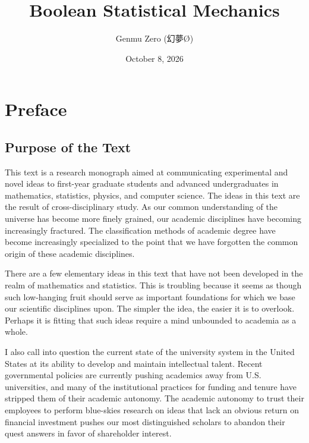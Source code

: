 \documentclass[10pt, a5paper, twoside, openright]{memoir}
\title{Boolean Statistical Mechanics}
\author{Genmu Zero (幻夢Ø)}
\date{October 8, 2026}
\begin{document}
%
%
    

\setlength{\parindent}{1.5em}


\clearpage\maketitle\thispagestyle{empty}


\frontmatter
\tableofcontents

\listoffigures


\chapter{Preface}

\section{Purpose of the Text}

This text is a research monograph aimed at communicating experimental and novel ideas to first-year graduate students and advanced undergraduates in mathematics, statistics, physics, and computer science. The ideas in this text are the result of cross-disciplinary study. As our common understanding of the universe has become more finely grained, our academic disciplines have becoming increasingly fractured. The classification methods of academic degree have become increasingly specialized to the point that we have forgotten the common origin of these academic disciplines.

There are a few elementary ideas in this text that have not been developed in the realm of mathematics and statistics. This is troubling because it seems as though such low-hanging fruit should serve as important foundations for which we base our scientific disciplines upon. The simpler the idea, the easier it is to overlook. Perhaps it is fitting that such ideas require a mind unbounded to academia as a whole.

I also call into question the current state of the university system in the United States at its ability to develop and maintain intellectual talent. Recent governmental policies are currently pushing academics away from U.S. universities, and many of the institutional practices for funding and tenure have stripped them of their academic autonomy. The academic autonomy to trust their employees to perform blue-skies research on ideas that lack an obvious return on financial investment pushes our most distinguished scholars to abandon their quest answers in favor of shareholder interest.
\end{document}
